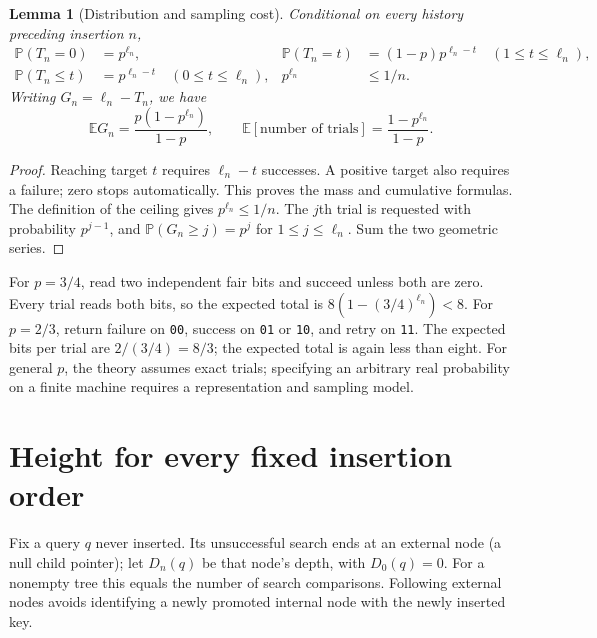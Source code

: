 \documentclass[11pt]{article}
\newtheorem{lemma}[theorem]{Lemma}
\newcommand{\E}{\mathbb E}
\newcommand{\Prob}{\mathbb P}
\begin{document}
\begin{lemma}[Distribution and sampling cost]\label{lem:target}
Conditional on every history preceding insertion $n$,
\begin{align}
 \Prob(T_n=0)&=p^{\ell_n}, &
 \Prob(T_n=t)&=(1-p)p^{\ell_n-t} \quad(1\le t\le\ell_n),\label{eq:mass}\\
 \Prob(T_n\le t)&=p^{\ell_n-t} \quad(0\le t\le\ell_n), &
 p^{\ell_n}&\le 1/n.\label{eq:cdf}
\end{align}
Writing $G_n=\ell_n-T_n$, we have
\[
 \E G_n=\frac{p(1-p^{\ell_n})}{1-p},\qquad
 \E[\text{number of trials}]=\frac{1-p^{\ell_n}}{1-p}.
\]
\end{lemma}
\begin{proof}
Reaching target $t$ requires $\ell_n-t$ successes. A positive target also
requires a failure; zero stops automatically. This proves the mass and
cumulative formulas. The definition of the ceiling gives $p^{\ell_n}\le1/n$.
The $j$th trial is requested with probability $p^{j-1}$, and
$\Prob(G_n\ge j)=p^j$ for $1\le j\le\ell_n$. Sum the two geometric series.
\end{proof}

For $p=3/4$, read two independent fair bits and succeed unless both are zero.
Every trial reads both bits, so the expected total is
$8(1-(3/4)^{\ell_n})<8$. For $p=2/3$, return failure on \texttt{00}, success
on \texttt{01} or \texttt{10}, and retry on \texttt{11}. The expected bits per
trial are $2/(3/4)=8/3$; the expected total is again less than eight. For general
$p$, the theory assumes exact trials; specifying an arbitrary real probability
on a finite machine requires a representation and sampling model.

\section{Height for every fixed insertion order}\label{sec:height}
Fix a query $q$ never inserted. Its unsuccessful search ends at an external
node (a null child pointer); let $D_n(q)$ be that node's depth, with $D_0(q)=0$.
For a nonempty tree this equals the number of search comparisons. Following
external nodes avoids identifying a newly promoted internal node with the
newly inserted key.
\end{document}
